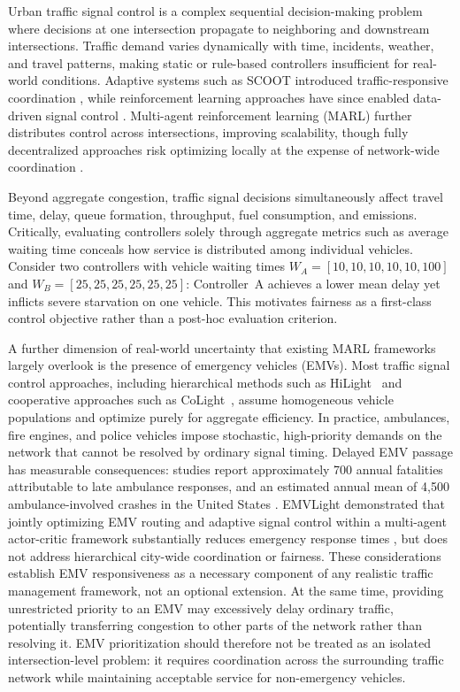 \documentclass[3p,times]{elsarticle}
\theoremstyle{plain}
\theoremstyle{definition}
\begin{document}
Urban traffic signal control is a complex sequential decision-making
problem where decisions at one intersection propagate to neighboring
and downstream intersections. Traffic demand varies dynamically with
time, incidents, weather, and travel patterns, making static or
rule-based controllers insufficient for real-world conditions.
Adaptive systems such as SCOOT introduced traffic-responsive
coordination \cite{scoot}, while reinforcement learning approaches
have since enabled data-driven signal control
\cite{intellight}. Multi-agent reinforcement learning (MARL) further
distributes control across intersections, improving scalability,
though fully decentralized approaches risk optimizing locally at the
expense of network-wide coordination \cite{thousandlights,ma2c}.

Beyond aggregate congestion, traffic signal decisions simultaneously
affect travel time, delay, queue formation, throughput, fuel
consumption, and emissions. Critically, evaluating controllers solely
through aggregate metrics such as average waiting time conceals how
service is distributed among individual vehicles. Consider two
controllers with vehicle waiting times
$W_A = [10, 10, 10, 10, 10, 100]$ and
$W_B = [25, 25, 25, 25, 25, 25]$: Controller~A achieves a lower mean
delay yet inflicts severe starvation on one vehicle. This motivates
fairness as a first-class control objective rather than a post-hoc
evaluation criterion.

A further dimension of real-world uncertainty that existing MARL
frameworks largely overlook is the presence of emergency vehicles
(EMVs). Most traffic signal control approaches, including hierarchical
methods such as HiLight~\cite{hilight} and cooperative approaches such
as CoLight~\cite{colight}, assume homogeneous vehicle populations and
optimize purely for aggregate efficiency. In practice, ambulances,
fire engines, and police vehicles impose stochastic, high-priority
demands on the network that cannot be resolved by ordinary signal
timing. Delayed EMV passage has measurable consequences: studies
report approximately 700 annual fatalities attributable to late
ambulance responses, and an estimated annual mean of 4{,}500
ambulance-involved crashes in the United States
\cite{nellore2016}. EMVLight demonstrated that jointly optimizing EMV
routing and adaptive signal control within a multi-agent actor-critic
framework substantially reduces emergency response times
\cite{emvlight}, but does not address hierarchical city-wide
coordination or fairness. These considerations establish EMV
responsiveness as a necessary component of any realistic traffic
management framework, not an optional extension. At the same time,
providing unrestricted priority to an EMV may excessively delay
ordinary traffic, potentially transferring congestion to other parts
of the network rather than resolving it. EMV prioritization should
therefore not be treated as an isolated intersection-level problem: it
requires coordination across the surrounding traffic network while
maintaining acceptable service for non-emergency vehicles.
\end{document}
